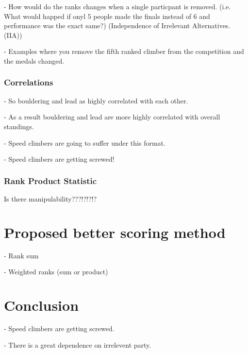 \documentclass{article}\usepackage[]{graphicx}\usepackage[]{color}
\begin{document}
- How would do the ranks changes when a single particpant is removed.  (i.e. What would happed if onyl 5 people made the finals instead of 6 and performance was the exact same?) (Independence of Irrelevant Alternatives.  (IIA))

- Examples where you remove the fifth ranked climber from the competition and the medals changed. 

\subsubsection{Correlations}

- So bouldering and lead as highly correlated with each other. 

- As a result bouldering and lead are more highly correlated with overall standings.  

- Speed climbers are going to suffer under this format.  

- Speed climbers are getting screwed!

\subsubsection{Rank Product Statistic}

Is there manipulability???!?!?!?

% 

\section{Proposed better scoring method}

- Rank sum

- Weighted ranks (sum or product)

\section{Conclusion}

- Speed climbers are getting screwed.  

- There is a great dependence on irrelevent party. 




\end{document}
